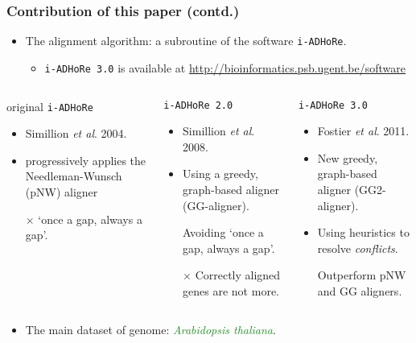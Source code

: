 \documentclass[xcolor=dvipsnames,envcountsect,handout]{beamer}
\begin{document}
\begin{frame}
\frametitle{Contribution of this paper (contd.)}
\vspace{-0.3cm}
\begin{itemize}
\item The alignment algorithm: a subroutine of the software 
{\tt i-ADHoRe}. 
\begin{itemize}
\item {\tt i-ADHoRe 3.0} is available at 
\href{http://bioinformatics.psb.ugent.be/software}
{\textcolor{OliveGreen}{http://bioinformatics.psb.ugent.be/software}}
\end{itemize}
\end{itemize}
\vspace{9pt}
\begin{footnotesize}
\begin{columns}
\begin{column}[t]{4cm}
{\hspace{8pt}} original {\tt i-ADHoRe}
\begin{itemize}
\item Simillion {\it et al}. 2004.
\item progressively applies the Needleman-Wunsch (pNW) aligner 
\item [$\times$] `once a gap, always a gap'.
\end{itemize}
\end{column}
\begin{column}[t]{4cm}
{\hspace{8pt}} {\tt i-ADHoRe 2.0}
\begin{itemize}
\item Simillion {\it et al}. 2008.
\item Using a greedy, graph-based aligner (GG-aligner).
\item [\checkmark] Avoiding `once a gap, always a gap'.
\item [$\times$] Correctly aligned genes are not more.
\end{itemize}
\end{column}
\begin{column}[t]{4cm}
{\hspace{8pt}} \alert{\tt i-ADHoRe 3.0}
\begin{itemize}
\item \alert{Fostier {\it et al}. 2011.}
\item \alert{New greedy, graph-based aligner (GG2-aligner).}
\item \alert{Using heuristics to resolve {\em conflicts}}.
\item [\checkmark] \alert{Outperform pNW and GG aligners.} 
\end{itemize}
\end{column}
\end{columns}
\end{footnotesize}
\vspace{6pt}
\begin{itemize}
\item The main dataset of genome: \textcolor{ForestGreen}{\em Arabidopsis 
thaliana}.
\end{itemize}
\end{frame}
\end{document}

